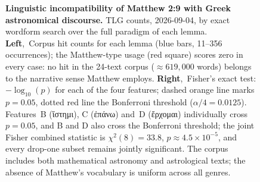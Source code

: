 \documentclass[sn-nature]{sn-jnl}
\newcommand{\grk}[1]{{\fontencoding{LGR}\selectfont #1}}
\newcommand{\grk}[1]{{\greekfont #1}}
\begin{document}
\begin{figure}[h!]
  \caption{\textbf{Linguistic incompatibility of Matthew 2:9 with Greek
    astronomical discourse.} TLG counts, 2026-09-04, by exact wordform
    search over the full paradigm of each lemma.
    \textbf{Left},~Corpus hit counts for each lemma (blue bars, 11--356
    occurrences); the Matthew-type usage (red square) scores zero in
    every case: no hit in the 24-text corpus ($\approx\!619{,}000$ words)
    belongs to the narrative sense Matthew employs.
    \textbf{Right},~Fisher's exact test: $-\log_{10}(p)$ for each of the
    four features; dashed orange line marks $p = 0.05$, dotted red line
    the Bonferroni threshold ($\alpha/4 = 0.0125$). Features~B
    (\grk{ἵστημι}), C (\grk{ἐπάνω}) and~D (\grk{ἔρχομαι}) individually cross
    $p = 0.05$, and B and D also cross the Bonferroni threshold; the joint Fisher
    combined statistic is $\chi^2(8) = 33.8$, $p \approx 4.5\times10^{-5}$,
    and every drop-one subset remains jointly significant.
    The corpus includes both mathematical astronomy and astrological texts;
    the absence of Matthew's vocabulary is uniform across all genres.}
  \label{fig:linguistics}
\end{figure}
\end{document}
